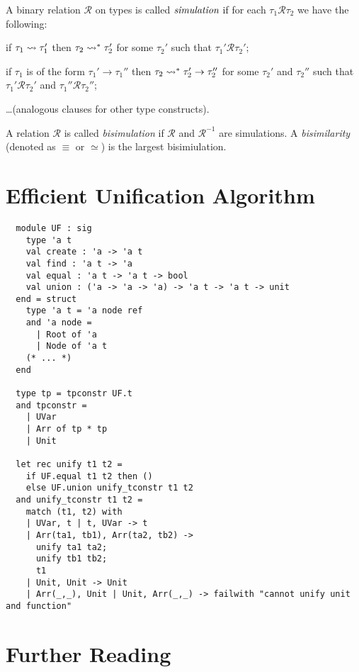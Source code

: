 \begin{defin}
  A binary relation $\mathcal{R}$ on types is called $\emph{simulation}$
  if for each $\tau_1\mathrel{\mathcal{R}} \tau_2$ we have the following:
  \begin{thmenumerate}
  \item if $\tau_1 \leadsto \tau_1'$ then
    $\tau_2 \leadsto^* \tau_2'$
    for some $\tau_2'$
    such that $\tau_1' \mathrel{\mathcal{R}} \tau_2'$;
  \item if $\tau_1$ is of the form $\tau_1' \to \tau_1''$
    then $\tau_2 \leadsto^* \tau_2' \to \tau_2''$
    for some $\tau_2'$ and $\tau_2''$
    such that $\tau_1' \mathrel{\mathcal{R}} \tau_2'$
    and $\tau_1'' \mathrel{\mathcal{R}} \tau_2''$;
  \item \ldots (analogous clauses for other type constructs).
  \end{thmenumerate}
  A relation $\mathcal{R}$ is called \emph{bisimulation}
  if $\mathcal{R}$ and $\mathcal{R}^{-1}$ are simulations.
  A \emph{bisimilarity} (denoted as $\equiv$ or $\simeq$)
  is the largest bisimiulation.
\end{defin}

\section{Efficient Unification Algorithm}

\begin{verbatim}
  module UF : sig
    type 'a t
    val create : 'a -> 'a t
    val find : 'a t -> 'a
    val equal : 'a t -> 'a t -> bool
    val union : ('a -> 'a -> 'a) -> 'a t -> 'a t -> unit
  end = struct
    type 'a t = 'a node ref
    and 'a node =
      | Root of 'a
      | Node of 'a t
    (* ... *)
  end
  
  type tp = tpconstr UF.t
  and tpconstr =
    | UVar
    | Arr of tp * tp
    | Unit

  let rec unify t1 t2 =
    if UF.equal t1 t2 then ()
    else UF.union unify_tconstr t1 t2
  and unify_tconstr t1 t2 =
    match (t1, t2) with
    | UVar, t | t, UVar -> t
    | Arr(ta1, tb1), Arr(ta2, tb2) ->
      unify ta1 ta2;
      unify tb1 tb2;
      t1
    | Unit, Unit -> Unit
    | Arr(_,_), Unit | Unit, Arr(_,_) -> failwith "cannot unify unit and function"
\end{verbatim}

\section{Further Reading}
